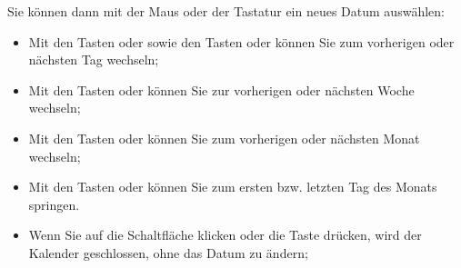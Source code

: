 Sie können dann mit der Maus oder der Tastatur ein neues Datum auswählen:

\noindent
\begin{minipage}{.65\linewidth}
	\begin{itemize}[rightmargin=.6cm]
		\item Mit den Tasten \keys{{+}} oder \keys{{-}} sowie den Tasten \keys{\arrowkeyleft} oder \keys{\arrowkeyright} können Sie zum vorherigen oder nächsten Tag wechseln;
		\item Mit den Tasten \keys{\arrowkeyup} oder \keys{\arrowkeydown} können Sie zur vorherigen oder nächsten Woche wechseln;
		\item Mit den Tasten  oder  können Sie zum vorherigen oder nächsten Monat wechseln;
		\item Mit den Tasten  oder  können Sie zum ersten bzw. letzten Tag des Monats springen.
		\item Wenn Sie auf die Schaltfläche  klicken oder die Taste  drücken, wird der Kalender geschlossen, ohne das Datum zu ändern;

\end{itemize}
\end{minipage}
